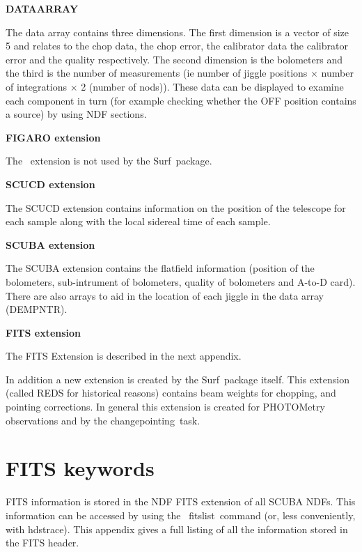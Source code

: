 \documentclass[twoside,11pt]{article}
\newcommand{\scusoft}          {{\sc Surf}}
\newcommand{\Kappa}{\xref{{\sc{Kappa}}}{sun95}{}}
\newcommand{\Figaro}{\xref{{\sc{Figaro}}}{sun86}{}}
\newcommand{\task}[1]{{\sf #1}}
\newcommand{\chgpnt}{\htmlref{\task{change\_pointing}}{CHANGE_POINTING}}
\newcommand{\fitslist}{\xref{\task{fitslist}}{sun95}{FITSLIST}}
\newcommand{\hdstrace}{\xref{\task{hdstrace}}{sun102}{}}
\newcommand{\htmlref}[2]{#1}
\newcommand{\xref}[3]{#1}
\newcommand{\xlabel}[1]{}
\renewcommand{\_}{\texttt{\symbol{95}}}
\begin{document}
\begin{description}
\item {\bf DATA\_ARRAY}

The data array contains three dimensions. The first dimension is a vector of
size 5 and relates to the chop data, the chop error, the calibrator data the
calibrator error and the quality respectively. The second dimension is the
bolometers and the third is the number of measurements (ie number of jiggle
positions $\times$ number of integrations $\times$ 2 (number of nods)). These
data can be displayed to examine each component in turn (for example checking
whether the OFF position contains a source) by using NDF sections.

\item {\bf FIGARO extension}

The \Figaro\ extension is not used by the \scusoft\ package.

\item {\bf SCUCD extension}

The SCUCD extension contains information on the position of the telescope for
each sample along with the local sidereal time of each sample.

\item {\bf SCUBA extension}

The SCUBA extension contains the flatfield information (position of the
bolometers, sub-intrument of bolometers, quality of bolometers and A-to-D
card). There are also arrays to aid in the location of each jiggle in the data
array (DEM\_PNTR).

\item {\bf FITS extension}

The FITS Extension is described in the next appendix.

\end{description}


In addition a new extension is created by the \scusoft\ package itself. This
extension (called REDS for historical reasons) contains beam weights for
chopping, and pointing corrections. In general this extension is created for
PHOTOMetry observations and by the \chgpnt\ task.

\section{\xlabel{fits}FITS keywords\label{fits}}

FITS information is stored in the NDF FITS extension of all SCUBA NDFs. This
information can be accessed by using the \Kappa\ \fitslist\ command (or,
less conveniently, with \hdstrace). This appendix gives a full listing
of all the information stored in the FITS header.
\end{document}
